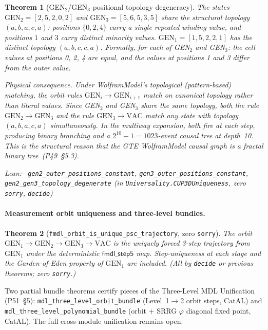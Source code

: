 \documentclass[11pt,a4paper]{article}
\newenvironment{leanref}%
  {\par\smallskip\noindent\begingroup\raggedright\textup{Lean:}~}%
  {\par\endgroup}
\newtheorem{theorem}{Theorem}[section]
\theoremstyle{definition}
\newcommand{\CatAL}{\ensuremath{\mathrm{CatAL}}}
\begin{document}
\begin{theorem}[GEN$_2$/GEN$_3$ positional topology degeneracy]\label{thm:gen23-topo}
The states $\mathrm{GEN}_2 = [2,5,2,0,2]$ and $\mathrm{GEN}_3 = [5,6,5,3,5]$
share the structural topology $(a,b,a,c,a)$: positions $\{0,2,4\}$ carry a single
repeated winding value, and positions $1$ and $3$ carry distinct minority values.
$\mathrm{GEN}_1 = [1,5,2,2,1]$ has the distinct topology $(a,b,c,c,a)$.
Formally, for each of GEN$_2$ and GEN$_3$: the cell values at positions 0, 2, 4
are equal, and the values at positions 1 and 3 differ from the outer value.

\noindent\emph{Physical consequence.}
Under WolframModel's topological (pattern-based) matching, the orbit rules
$\mathrm{GEN}_i \to \mathrm{GEN}_{i+1}$ match on canonical topology rather
than literal values.  Since GEN$_2$ and GEN$_3$ share the same topology,
both the rule $\mathrm{GEN}_2\!\to\!\mathrm{GEN}_3$ and the rule
$\mathrm{GEN}_3\!\to\!\mathrm{VAC}$ match any state with topology $(a,b,a,c,a)$
simultaneously.  In the multiway expansion, both fire at each step, producing
binary branching and a $2^{10}-1 = 1023$-event causal tree at depth~10.
This is the structural reason that the GTE WolframModel causal graph is a
fractal binary tree~(P49~\S5.3).

\begin{leanref}
\lstinline|gen2_outer_positions_constant|,
\lstinline|gen3_outer_positions_constant|,
\lstinline|gen2_gen3_topology_degenerate|
\textup{(in \texttt{Universality.CUP3DUniqueness}, zero \texttt{sorry},
\texttt{decide})}
\end{leanref}
\end{theorem}

\paragraph{Measurement orbit uniqueness and three-level bundles.}
\begin{theorem}[\lstinline|fmdl_orbit_is_unique_psc_trajectory|, zero \texttt{sorry}]
The orbit $\mathrm{GEN}_1\to\mathrm{GEN}_2\to\mathrm{GEN}_3\to\mathrm{VAC}$ is the
uniquely forced 3-step trajectory from $\mathrm{GEN}_1$ under the deterministic
$\mathsf{fmdl\_step5}$ map. Step-uniqueness at each stage and the Garden-of-Eden property
of $\mathrm{GEN}_1$ are included. (All by \texttt{decide} or previous theorems; zero \texttt{sorry}.)
\end{theorem}

\noindent Two partial bundle theorems certify pieces of the Three-Level MDL Unification
(P51~\S5): \lstinline|mdl_three_level_orbit_bundle| (Level~1$\to$2 orbit steps, \CatAL) and
\lstinline|mdl_three_level_polynomial_bundle| (orbit + SRRG $\varphi$ diagonal fixed point, \CatAL).
The full cross-module unification remains open.
\end{document}
